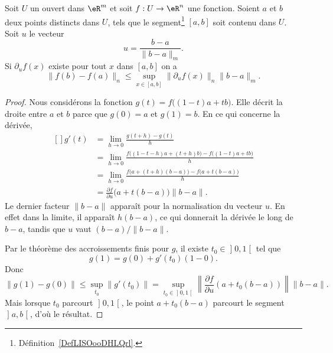 \begin{theorem}      \label{val_medio_1}
	Soit \( U\) un ouvert dans \( \eR^m\) et soit \( f:U\to\eR^n\) une fonction. Soient \( a\) et \( b\) deux points distincts dans \( U\), tels que le segment\footnote{Définition~\ref{DefLISOooDHLQrl}.} \( [a,b]\) soit contenu dans \( U\). Soit \( u\) le vecteur
	\[
		u=\frac{b-a}{\|b-a\|_m}.
	\]
	Si \( \partial_u f(x)\) existe pour tout \( x\) dans \( [a,b]\) on a
	\[
		\|f(b)-f(a)\|_n\leq \sup_{x\in[a,b]}\|\partial_uf(x)\|_n\|b-a\|_m.
	\]
\end{theorem}

\begin{proof}
	Nous considérons la fonction \( g(t)=f\big( (1-t)a+tb \big)\). Elle décrit la droite entre \( a\) et \( b\) parce que \( g(0)=a\) et \( g(1)=b\). En ce qui concerne la dérivée,
	\begin{equation}
		\begin{aligned}[]
			g'(t) & =\lim_{h\to 0} \frac{ g(t+h)-g(t) }{ h }                                          \\
			      & =\lim_{h\to 0} \frac{ f\big( (1-t-h)a+(t+h)b \big)- f\big( (1-t)a+tb \big) }{ h } \\
			      & =\lim_{h\to 0} \frac{ f\big( a+(t+h)(b-a) \big)-f\big( a+t(b-a) \big) }{ h }      \\
			      & =\frac{ \partial f }{ \partial u }\big( a+t(b-a) \big)\| b-a \|.
		\end{aligned}
	\end{equation}
	Le dernier facteur \( \| b-a \|\) apparaît pour la normalisation du vecteur \( u\). En effet dans la limite, il apparaît \( h(b-a)\), ce qui donnerait la dérivée le long de \( b-a\), tandis que \( u\) vaut \( (b-a)/\| b-a \|\).

	Par le théorème des accroissements finis pour \( g\), il existe \( t_0\in\mathopen] 0 , 1 \mathclose[\) tel que
		\begin{equation}
			g(1)=g(0)+g'(t_0)(1-0).
		\end{equation}
		Donc
		\begin{equation}
			\| g(1)-g(0) \|\leq\sup_{t_0}\| g'(t_0) \|=\sup_{t_0\in\mathopen] 0 , 1 \mathclose[}\left\| \frac{ \partial f }{ \partial u }(a+t_0(b-a)) \right\|\| b-a \|.
		\end{equation}
		Mais lorsque \( t_0\) parcourt \( \mathopen] 0 , 1 \mathclose[\), le point \( a+t_0(b-a)\) parcourt le segment \( \mathopen] a , b \mathclose[\), d'où le résultat.
\end{proof}


